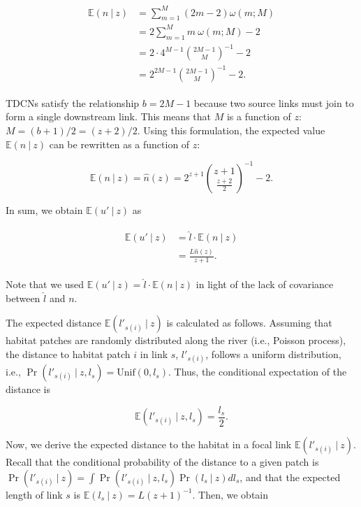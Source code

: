 \documentclass[11pt, class=article, crop=false]{standalone}
\begin{document}
\begin{align}
    \begin{split}
    \mathbb{E}(n~|~z) 
        &= \sum_{m=1}^{M} (2m - 2) \omega(m; M)\\
        &= 2 \sum_{m=1}^{M} m~\omega(m; M) - 2\\
        &= 2 \cdot 4^{M-1} \binom{2M-1}{M}^{-1} - 2\\
        &= 2^{2M-1} \binom{2M-1}{M}^{-1} - 2.
    \end{split}
    \label{eq:n-hat}
\end{align}

TDCNs satisfy the relationship $b = 2M - 1$ because two source links must join to form a single downstream link.
This means that $M$ is a function of $z$: $M = (b + 1) / 2 = (z + 2) / 2$.
Using this formulation, the expected value $\mathbb{E}(n~|~z)$ can be rewritten as a function of $z$:

\begin{equation}
    \mathbb{E}(n~|~z) = \hat{n}(z) = 
    2^{z + 1} \binom{z + 1}{\frac{z + 2}{2}}^{-1} - 2.
\end{equation}

In sum, we obtain $\mathbb{E}(u' ~|~ z)$ as

\begin{align}
    \begin{split}
        \mathbb{E}(u' ~|~ z) 
        &= \hat{l} \cdot \mathbb{E}(n ~|~ z)\\
        &= \frac{L \hat{n}(z)}{z + 1}.
    \end{split}
\end{align}

Note that we used $\mathbb{E}(u' ~|~ z)  = \hat{l} \cdot \mathbb{E}(n ~|~ z)$ in light of the lack of covariance between $\hat{l}$ and $n$.

The expected distance $\mathbb{E}(l'_{s(i)}~|~z)$ is calculated as follows.
Assuming that habitat patches are randomly distributed along the river (i.e., Poisson process), the distance to habitat patch $i$ in link $s$, $l'_{s(i)}$, follows a uniform distribution, i.e.,  $\Pr(l'_{s(i)}~|~z, l_s) = \mbox{Unif}(0, l_s)$.
Thus, the conditional expectation of the distance is

\begin{equation}
    \mathbb{E}(l'_{s(i)}~|~z, l_s) = \frac{l_s}{2}.
\end{equation}

Now, we derive the expected distance to the habitat in a focal link $\mathbb{E}(l'_{s(i)}~|~z)$.
Recall that the conditional probability of the distance to a given patch is $\Pr(l'_{s(i)}~|~z)= \int \Pr(l'_{s(i)}~|~z, l_s) \Pr(l_s~|~z)d l_s$, and that the expected length of link $s$ is $\mathbb{E}(l_s~|~z) = L(z+1)^{-1}$.
Then, we obtain 
\end{document}
